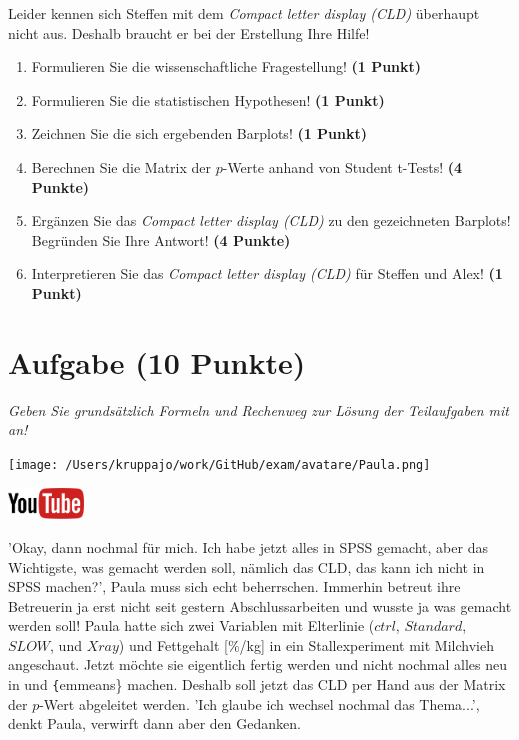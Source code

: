 \documentclass[a4paper, 9pt]{scrartcl}\usepackage[]{graphicx}\usepackage[]{xcolor}
\begin{document}
Leider kennen sich Steffen mit dem \textit{Compact letter display (CLD)} überhaupt nicht aus. Deshalb braucht er bei der Erstellung Ihre Hilfe!

\begin{enumerate}
  \item Formulieren Sie die wissenschaftliche Fragestellung! \textbf{(1 Punkt)}
  \item Formulieren Sie die statistischen Hypothesen! \textbf{(1 Punkt)}
\item Zeichnen Sie die sich ergebenden Barplots! \textbf{(1 Punkt)}
\item Berechnen Sie die Matrix der $p$-Werte anhand von Student t-Tests! \textbf{(4 Punkte)}
\item Ergänzen Sie das \textit{Compact letter display (CLD)} zu den gezeichneten Barplots! Begründen Sie Ihre Antwort! \textbf{(4 Punkte)}
\item Interpretieren Sie das \textit{Compact letter display (CLD)} für Steffen und Alex! \textbf{(1 Punkt)} 
\end{enumerate}

 
\clearpage

\section{Aufgabe \hfill (10 Punkte)}

\textit{Geben Sie grundsätzlich Formeln und Rechenweg zur Lösung der Teilaufgaben mit an!} \\[1Ex]
 

 
\begin{minipage}[t]{0.5\textwidth}
\texttt{[image: /Users/kruppajo/work/GitHub/exam/avatare/Paula.png]}
\end{minipage}
\begin{minipage}[t]{0.5\textwidth}
\hfill
\href{https://youtu.be/RagTFFKFbFg}{\includegraphics[width = 2cm]{img/youtube}}
\end{minipage}
\vspace{1ex}



'Okay, dann nochmal für mich. Ich habe jetzt alles in SPSS gemacht, aber das Wichtigste, was gemacht werden soll, nämlich das CLD, das kann ich nicht in SPSS machen?', Paula muss sich echt beherrschen. Immerhin betreut ihre Betreuerin ja erst nicht seit gestern Abschlussarbeiten und wusste ja was gemacht werden soll! Paula hatte sich zwei Variablen mit Elterlinie ($ctrl$, $Standard$, $SLOW$, und $Xray$) und Fettgehalt [\%/kg] in ein Stallexperiment mit Milchvieh angeschaut. Jetzt möchte sie eigentlich fertig werden und nicht nochmal alles neu in \Rlogo und \texttt\{emmeans\} machen. Deshalb soll jetzt das CLD per Hand aus der Matrix der $p$-Wert abgeleitet werden. 'Ich glaube ich wechsel nochmal das Thema...', denkt Paula, verwirft dann aber den Gedanken.
\end{document}
